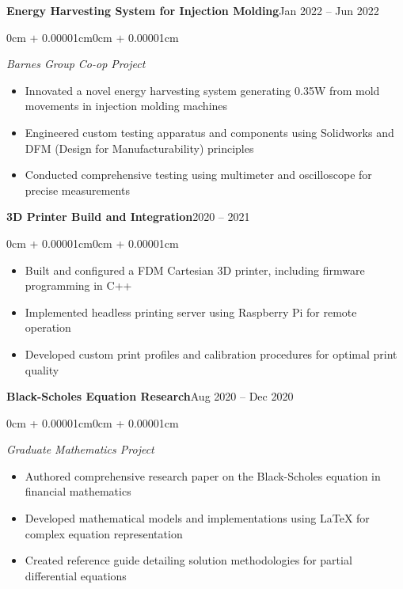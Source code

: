 \documentclass[10pt, letterpaper]{article}
\newenvironment{highlights}{
    \begin{itemize}[
        leftmargin=0.5cm,
        rightmargin=0cm,
        itemindent=0cm,
        labelwidth=0.3cm,
        labelsep=0.2cm,
        align=left,
        itemsep=0.05cm,
        topsep=0.05cm,
        parsep=0.05cm,
        partopsep=0pt
    ]
}{
    \end{itemize}
    \vspace{0.1cm}
}
\newenvironment{onecolentry}{
    \begin{adjustwidth}{0cm + 0.00001cm}{0cm + 0.00001cm}
}{
    \end{adjustwidth}
}
\begin{document}
    \begin{twocolentry}{\textbf{Energy Harvesting System for Injection Molding}}{Jan 2022 -- Jun 2022}
    \end{twocolentry}
    \begin{onecolentry}
    \textit{Barnes Group Co-op Project}
    \begin{highlights}
        \item Innovated a novel energy harvesting system generating 0.35W from mold movements in injection molding machines
        \item Engineered custom testing apparatus and components using Solidworks and DFM (Design for Manufacturability) principles
        \item Conducted comprehensive testing using multimeter and oscilloscope for precise measurements
    \end{highlights}
    \end{onecolentry}

    \begin{twocolentry}{\textbf{3D Printer Build and Integration}}{2020 -- 2021}
    \end{twocolentry}
    \begin{onecolentry} 
    \begin{highlights}
        \item Built and configured a FDM Cartesian 3D printer, including firmware programming in C++
        \item Implemented headless printing server using Raspberry Pi for remote operation
        \item Developed custom print profiles and calibration procedures for optimal print quality
    \end{highlights}
    \end{onecolentry}

    \begin{twocolentry}{\textbf{Black-Scholes Equation Research}}{Aug 2020 -- Dec 2020}
    \end{twocolentry}
    \begin{onecolentry}
    \textit{Graduate Mathematics Project}
    \begin{highlights}
        \item Authored comprehensive research paper on the Black-Scholes equation in financial mathematics
        \item Developed mathematical models and implementations using LaTeX for complex equation representation
        \item Created reference guide detailing solution methodologies for partial differential equations
    \end{highlights}
    \end{onecolentry}
\end{document}
